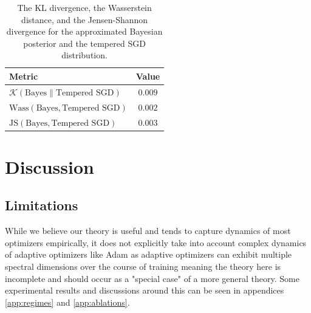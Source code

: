 \documentclass{article} %
\theoremstyle{definition}
\begin{document}
\begin{table}[h]
\centering
\begin{tabular}{l c}
\hline
\textbf{Metric} & \textbf{Value} \\
\hline
$\mathcal{K}(\text{Bayes}\| \text{Tempered SGD})$ & $0.009$ \\
$\text{Wass}(\text{Bayes}, \text{Tempered SGD})$ & $0.002$ \\
$\text{JS}(\text{Bayes}, \text{Tempered SGD})$ & $0.003$ \\
\hline
\end{tabular}
\caption{The KL divergence, the Wasserstein distance, and the Jensen-Shannon divergence for the approximated Bayesian posterior and the tempered SGD distribution.}
\label{tab:statistical_measures}
\end{table}




\section{Discussion}

\subsection{Limitations}
While we believe our theory is useful and tends to capture dynamics of most optimizers empirically, it does not explicitly take into account complex dynamics of adaptive optimizers like Adam \citep{kingma2017adammethodstochasticoptimization} as adaptive optimizers can exhibit multiple spectral dimensions over the course of training meaning the theory here is incomplete and should occur as a "special case" of a more general theory. Some experimental results and discussions around this can be seen in appendices \ref{app:regimes} and \ref{app:ablations}. %
\end{document}
